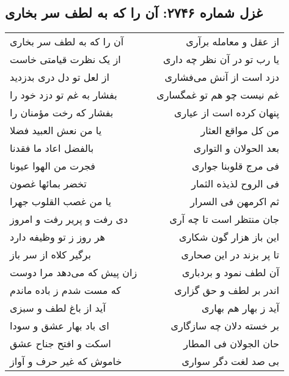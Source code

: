 \begin{center}
\section*{غزل شماره ۲۷۴۶: آن را که به لطف سر بخاری}
\label{sec:2746}
\begin{longtable}{l p{0.5cm} r}
آن را که به لطف سر بخاری
&&
از عقل و معامله برآری
\\
از یک نظرت قیامتی خاست
&&
یا رب تو در آن نظر چه داری
\\
از لعل تو دل دری بدزدید
&&
دزد است از آنش می‌فشاری
\\
بفشار به غم تو دزد خود را
&&
غم نیست چو هم تو غمگساری
\\
بفشار که رخت مؤمنان را
&&
پنهان کرده است از عیاری
\\
یا من نعش العبید فضلا
&&
من کل مواقع العثار
\\
بالفضل اعاد ما فقدنا
&&
بعد الحولان و التواری
\\
فجرت من الهوا عیونا
&&
فی مرج قلوبنا جواری
\\
تخضر بمائها غصون
&&
فی الروح لذیذه الثمار
\\
یا من غصب القلوب جهرا
&&
ثم اکرمهن فی السرار
\\
دی رفت و پریر رفت و امروز
&&
جان منتظر است تا چه آری
\\
هر روز ز تو وظیفه دارد
&&
این باز هزار گون شکاری
\\
برگیر کلاه از سر باز
&&
تا پر بزند در این صحاری
\\
زان پیش که می‌دهد مرا دوست
&&
آن لطف نمود و بردباری
\\
که مست شدم ز باده ماندم
&&
اندر بر لطف و حق گزاری
\\
آید از باغ لطف و سبزی
&&
آید ز بهار هم بهاری
\\
ای باد بهار عشق و سودا
&&
بر خسته دلان چه سازگاری
\\
اسکت و افتح جناح عشق
&&
حان الجولان فی المطار
\\
خاموش که غیر حرف و آواز
&&
بی صد لغت دگر سواری
\\
\end{longtable}
\end{center}
